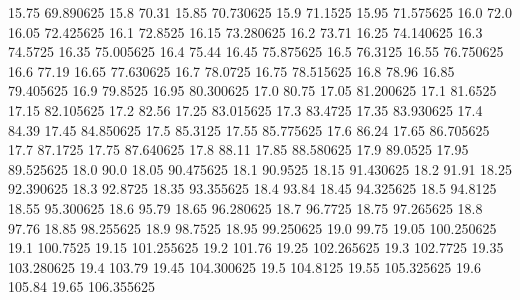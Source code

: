           15.75        69.890625
           15.8            70.31
          15.85        70.730625
           15.9          71.1525
          15.95        71.575625
           16.0             72.0
          16.05        72.425625
           16.1          72.8525
          16.15        73.280625
           16.2            73.71
          16.25        74.140625
           16.3          74.5725
          16.35        75.005625
           16.4            75.44
          16.45        75.875625
           16.5          76.3125
          16.55        76.750625
           16.6            77.19
          16.65        77.630625
           16.7          78.0725
          16.75        78.515625
           16.8            78.96
          16.85        79.405625
           16.9          79.8525
          16.95        80.300625
           17.0            80.75
          17.05        81.200625
           17.1          81.6525
          17.15        82.105625
           17.2            82.56
          17.25        83.015625
           17.3          83.4725
          17.35        83.930625
           17.4            84.39
          17.45        84.850625
           17.5          85.3125
          17.55        85.775625
           17.6            86.24
          17.65        86.705625
           17.7          87.1725
          17.75        87.640625
           17.8            88.11
          17.85        88.580625
           17.9          89.0525
          17.95        89.525625
           18.0             90.0
          18.05        90.475625
           18.1          90.9525
          18.15        91.430625
           18.2            91.91
          18.25        92.390625
           18.3          92.8725
          18.35        93.355625
           18.4            93.84
          18.45        94.325625
           18.5          94.8125
          18.55        95.300625
           18.6            95.79
          18.65        96.280625
           18.7          96.7725
          18.75        97.265625
           18.8            97.76
          18.85        98.255625
           18.9          98.7525
          18.95        99.250625
           19.0            99.75
          19.05       100.250625
           19.1         100.7525
          19.15       101.255625
           19.2           101.76
          19.25       102.265625
           19.3         102.7725
          19.35       103.280625
           19.4           103.79
          19.45       104.300625
           19.5         104.8125
          19.55       105.325625
           19.6           105.84
          19.65       106.355625
